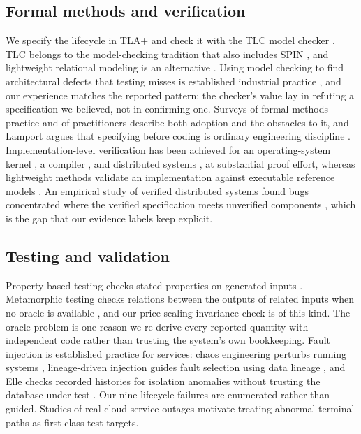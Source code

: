 \documentclass[preprint,3p,authoryear,12pt]{elsarticle}
\begin{document}
\subsection{Formal methods and verification}
We specify the lifecycle in TLA+ \citep{tla,lamportspec} and check it with the TLC model
checker \citep{tlc}. TLC belongs to the model-checking tradition \citep{clarke} that also
includes SPIN \citep{spin}, and lightweight relational modeling is an alternative
\citep{alloy}. Using
model checking to find architectural defects that testing misses is established
industrial practice \citep{awsformal}, and our experience matches the reported pattern:
the checker's value lay in refuting a specification we believed, not in confirming one.
Surveys of formal-methods practice \citep{woodcock} and of practitioners
\citep{gleirscher} describe both adoption and the obstacles to it, and Lamport argues that
specifying before coding is ordinary engineering discipline \citep{blueprints}.
Implementation-level verification has been achieved for an operating-system kernel
\citep{sel4}, a compiler \citep{compcert}, and distributed systems \citep{ironfleet}, at
substantial proof effort, whereas lightweight methods validate an implementation against
executable reference models \citep{s3lightweight}. An empirical study of verified
distributed systems found bugs concentrated where the verified specification meets
unverified components \citep{fonseca}, which is the gap that our evidence labels keep
explicit.

\subsection{Testing and validation}
Property-based testing checks stated properties on generated inputs \citep{quickcheck}.
Metamorphic testing checks relations between the outputs of related inputs when no
oracle is available \citep{metamorphic18,segura}, and our price-scaling invariance check
is of this kind. The oracle problem \citep{oracle} is one reason we re-derive every
reported quantity with independent code rather than trusting the system's own
bookkeeping. Fault injection is established practice for services: chaos engineering
perturbs running systems \citep{chaos}, lineage-driven injection guides fault selection
using data lineage \citep{lineage}, and Elle checks recorded histories for isolation
anomalies without trusting the database under test \citep{elle}. Our nine lifecycle
failures are enumerated rather than guided. Studies of real cloud service outages
\citep{gunawi} motivate treating abnormal terminal paths as first-class test targets.
\end{document}
